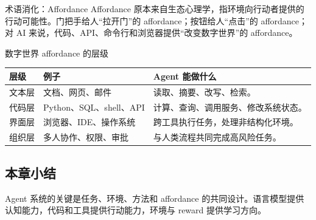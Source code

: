 \begin{knowledgebox}{术语消化：Affordance}
Affordance 原本来自生态心理学，指环境向行动者提供的行动可能性。门把手给人“拉开门”的 affordance；按钮给人“点击”的 affordance；对 AI 来说，代码、API、命令行和浏览器提供“改变数字世界”的 affordance。
\end{knowledgebox}

\begin{knowledgebox}{数字世界 affordance 的层级}
\begin{tabularx}{\textwidth}{p{}p{}X}
\toprule
层级 & 例子 & Agent 能做什么 \\
\midrule
文本层 & 文档、网页、邮件 & 读取、摘要、改写、检索。 \\
代码层 & Python、SQL、shell、API & 计算、查询、调用服务、修改系统状态。 \\
界面层 & 浏览器、IDE、操作系统 & 跨工具执行任务，处理非结构化环境。 \\
组织层 & 多人协作、权限、审批 & 与人类流程共同完成高风险任务。 \\
\bottomrule
\end{tabularx}
\end{knowledgebox}

\subsection{本章小结}

Agent 系统的关键是任务、环境、方法和 affordance 的共同设计。语言模型提供认知能力，代码和工具提供行动能力，环境与 reward 提供学习方向。


